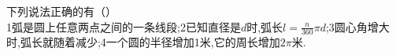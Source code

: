 下列说法正确的有\hfill （\quad）\\

\textcircled{\small{1}}弧是圆上任意两点之间的一条线段;\textcircled{\small{2}}已知直径是$d$时,弧长$l=\frac{n}{360}\pi d$;\textcircled{\small{3}}圆心角增大时,弧长就随着减少;\textcircled{\small{4}}一个圆的半径增加1米,它的周长增加$2\pi$米.





